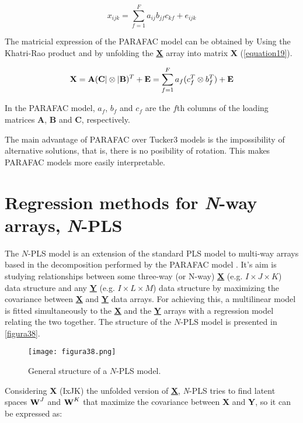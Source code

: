 \begin{equation}
x_{ijk}=\sum\limits_{f=1}^F a_{ij}b_{jf}c_{kf}+e_{ijk}
\label{equation16}
\end{equation}

The matricial expression of the PARAFAC model can be obtained by Using the Khatri-Rao product \parencite{liu2008hadamard} and by unfolding the \textbf{\underline{X}} array into matrix \textbf{X} (\autoref{equation19}).

\begin{equation}
\textbf{\text{X}}=\textbf{\text{A}}(\textbf{\text{C}}|\otimes|\textbf{\text{B}})^T + \textbf{\text{E}} = \sum\limits_{f=1}^F a_f(c^T_f\otimes b^T_f)+\textbf{\text{E}}
\label{equation19}
\end{equation}

In the PARAFAC model, $a_f$, $b_f$ and $c_f$ are the $f$th columns of the loading matrices \textbf{A}, \textbf{B} and \textbf{C}, respectively.

The main advantage of PARAFAC over Tucker3 models is the impossibility of alternative solutions, that is, there is no posibility of rotation. This makes PARAFAC models more easily interpretable.

\section{Regression methods for \textit{N}-way arrays, \textit{N}-PLS}
\label{NPLSregression}
The $N$-PLS model is an extension of the standard PLS model to multi-way arrays based in the decomposition performed by the PARAFAC model \parencite{bro1996multiway}. It's aim is studying relationships between some three-way (or N-way) \textbf{\underline{X}} (e.g. $I \times J \times K$) data structure and any \textbf{\underline{Y}} (e.g. $I \times L \times M$) data structure by maximizing the covariance between \textbf{\underline{X}} and \textbf{\underline{Y}} data arrays. For achieving this, a multilinear model is fitted simultaneously to the \textbf{\underline{X}} and the \textbf{\underline{Y}} arrays with a regression model relating the two together. The structure of the $N$-PLS model is presented in \autoref{figura38}.

\begin{figure}[hbtp]
\centering
\texttt{[image: figura38.png]}
\caption{General structure of a $N$-PLS model.}
\label{figura38}
\end{figure}


Considering \textbf{X} (IxJK) the unfolded version of \textbf{\underline{X}}, \textit{N}-PLS tries to find latent spaces $\textbf{\text{W}}^{J}$ and $\textbf{\text{W}}^{K}$ that maximize the covariance between \textbf{X} and \textbf{Y}, so it can be expressed as:

